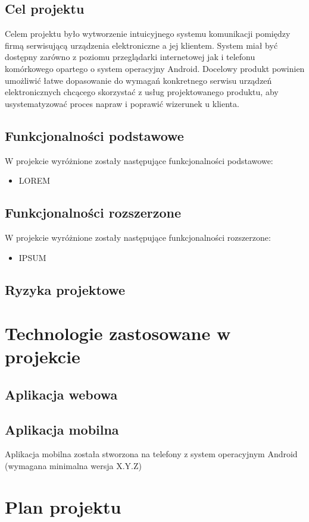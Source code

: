 \documentclass[a4paper,11pt]{article}
\begin{document}
\subsection{Cel projektu}
Celem projektu było wytworzenie intuicyjnego systemu komunikacji pomiędzy firmą serwisującą urządzenia elektroniczne a jej klientem. System miał być dostępny zarówno z poziomu przeglądarki internetowej jak i telefonu komórkowego opartego o system operacyjny Android. Docelowy produkt powinien umożliwić łatwe dopasowanie do wymagań konkretnego serwisu urządzeń elektronicznych chcącego skorzystać z usług projektowanego produktu, aby usystematyzować proces napraw i poprawić wizerunek u klienta.
\subsection{Funkcjonalności podstawowe}
W projekcie wyróżnione zostały następujące funkcjonalności podstawowe:
\begin{itemize}
	\item LOREM
\end{itemize}
\subsection{Funkcjonalności rozszerzone}
W projekcie wyróżnione zostały następujące funkcjonalności rozszerzone:
\begin{itemize}
	\item IPSUM
\end{itemize}
\subsection{Ryzyka projektowe}
\section{Technologie zastosowane w projekcie}
\subsection{Aplikacja webowa}
\subsection{Aplikacja mobilna}
Aplikacja mobilna została stworzona na telefony z system operacyjnym Android (wymagana minimalna wersja X.Y.Z)
\section{Plan projektu}
\end{document}
